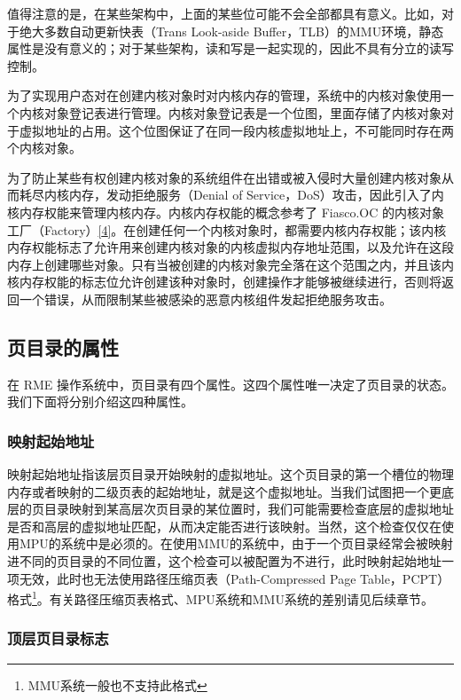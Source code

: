值得注意的是，在某些架构中，上面的某些位可能不会全部都具有意义。比如，对于绝大多数自动更新快表（Trans
Look-aside
Buffer，TLB）的MMU环境，静态属性是没有意义的；对于某些架构，读和写是一起实现的，因此不具有分立的读写控制。

为了实现用户态对在创建内核对象时对内核内存的管理，系统中的内核对象使用一个内核对象登记表进行管理。内核对象登记表是一个位图，里面存储了内核对象对于虚拟地址的占用。这个位图保证了在同一段内核虚拟地址上，不可能同时存在两个内核对象。

为了防止某些有权创建内核对象的系统组件在出错或被入侵时大量创建内核对象从而耗尽内核内存，发动拒绝服务（Denial
of
Service，DoS）攻击，因此引入了内核内存权能来管理内核内存。内核内存权能的概念参考了 Fiasco.OC 的内核对象工厂（Factory）\hyperref[cite:3-4]{{[}4{]}}。在创建任何一个内核对象时，都需要内核内存权能；该内核内存权能标志了允许用来创建内核对象的内核虚拟内存地址范围，以及允许在这段内存上创建哪些对象。只有当被创建的内核对象完全落在这个范围之内，并且该内核内存权能的标志位允许创建该种对象时，创建操作才能够被继续进行，否则将返回一个错误，从而限制某些被感染的恶意内核组件发起拒绝服务攻击。

\subsection{页目录的属性}\label{subsec:3-page-directory-attributes}

在 RME 操作系统中，页目录有四个属性。这四个属性唯一决定了页目录的状态。我们下面将分别介绍这四种属性。

\subsubsection{映射起始地址}\label{subsubsec:3-mapping-base-address}

映射起始地址指该层页目录开始映射的虚拟地址。这个页目录的第一个槽位的物理内存或者映射的二级页表的起始地址，就是这个虚拟地址。当我们试图把一个更底层的页目录映射到某高层次页目录的某位置时，我们可能需要检查底层的虚拟地址是否和高层的虚拟地址匹配，从而决定能否进行该映射。当然，这个检查仅仅在使用MPU的系统中是必须的。在使用MMU的系统中，由于一个页目录经常会被映射进不同的页目录的不同位置，这个检查可以被配置为不进行，此时映射起始地址一项无效，此时也无法使用路径压缩页表（Path-Compressed
Page
Table，PCPT）格式\footnote{MMU系统一般也不支持此格式}。有关路径压缩页表格式、MPU系统和MMU系统的差别请见后续章节。

\subsubsection{顶层页目录标志}\label{subsubsec:3-top-level-page-directory-flag}


